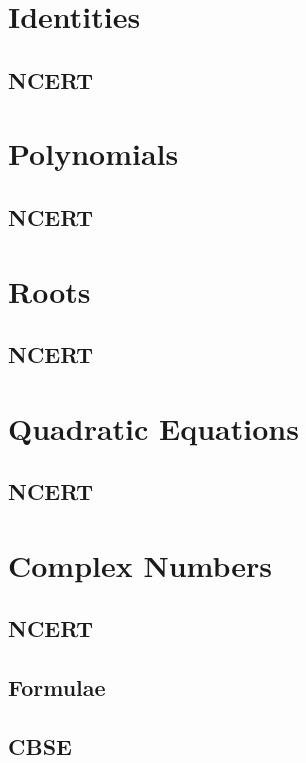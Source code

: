 \documentclass[journal]{IEEEtran}
\begin{document}
\newpage


\tableofcontents

\newpage
\onecolumn


\renewcommand{\thetable}{\theenumi}

\section{Identities}
\subsection{NCERT}

\section{Polynomials}
\subsection{NCERT}

\section{Roots}
\subsection{NCERT}

\section{Quadratic Equations}
\subsection{NCERT}

\section{Complex Numbers}
\subsection{NCERT}

\iffalse
\subsection{Formulae}

\subsection{CBSE}

\end{document}
